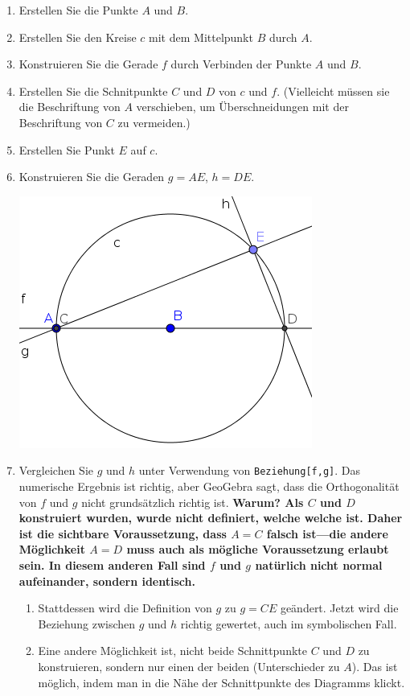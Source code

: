 \documentclass{article}
\begin{document}
\begin{enumerate}
    \item Erstellen Sie die Punkte $A$ und $B$.
    \item Erstellen Sie den Kreise $c$ mit dem Mittelpunkt $B$ durch $A$.
    \item Konstruieren Sie die Gerade $f$ durch Verbinden der Punkte $A$ und $B$.
    \item Erstellen Sie die Schnitpunkte $C$ und $D$ von $c$ und $f$. (Vielleicht müssen sie die Beschriftung von $A$ verschieben, um Überschneidungen mit der Beschriftung von $C$ zu vermeiden.)
    \item Erstellen Sie Punkt $E$ auf $c$.
    \item Konstruieren Sie die Geraden $g=AE$, $h=DE$.
\begin{center}
\includegraphics[scale=0.5]{limitations-Thales2-2}
\end{center}
    \item Vergleichen Sie $g$ und $h$ unter Verwendung von \texttt{Beziehung[f,g]}. Das numerische Ergebnis ist richtig, aber GeoGebra sagt, dass die Orthogonalität von $f$ und $g$ nicht grundsätzlich richtig ist. \textbf{Warum? Als $C$ und $D$ konstruiert wurden, wurde nicht definiert, welche welche ist. Daher ist die sichtbare Voraussetzung, dass $A=C$ falsch ist---die andere Möglichkeit $A=D$ muss auch als mögliche Voraussetzung erlaubt sein. In diesem anderen Fall sind $f$ und $g$ natürlich nicht normal aufeinander, sondern identisch.}
\begin{enumerate}
      \item Stattdessen wird die Definition von $g$ zu $g=CE$ geändert. Jetzt wird die Beziehung zwischen $g$ und $h$ richtig gewertet, auch im symbolischen Fall.
      \item Eine andere Möglichkeit ist, nicht beide Schnittpunkte $C$ und $D$ zu konstruieren, sondern nur einen der beiden (Unterschieder zu $A$). Das ist möglich, indem man in die Nähe der Schnittpunkte des Diagramms klickt.

\end{enumerate}
\end{enumerate}
\end{document}
